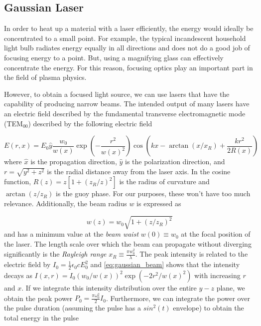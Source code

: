 \subsection{Gaussian Laser}
In order to heat up a material with a laser efficiently, the energy would ideally be concentrated to a small point. For example, the typical incandescent household light bulb radiates energy equally in all directions and does not do a good job of focusing energy to a point. But, using a magnifying glass can effectively concentrate the energy. For this reason, focusing optics play an important part in the field of plasma physics. 

However, to obtain a focused light source, we can use lasers that have the capability of producing narrow beams. The intended output of many lasers have an electric field described by the fundamental transverse electromagnetic mode \cite{Zangwill_2012} (TEM$_{00}$) described by the following electric field

\begin{equation}
	E(r, x) = E_0 \hat{y} \frac{w_0}{w(x)} \exp( - \frac{r^2}{w(x)^2}) \cos(k x - \arctan(x/x_R) + \frac{k r^2}{2 R(x)}) \label{eq:gaussian_beam}
\end{equation}
where $\hat{x}$ is the propagation direction, $\hat{y}$ is the polarization direction, and $r = \sqrt{y^2 + z^2}$ is the radial distance away from the laser axis. In the cosine function, $R(z) = z [1 + (z_R/z)^2]$ is the radius of curvature and $\arctan(z/z_R)$ is the guoy phase. For our purposes, these won't have too much relevance. Additionally, the beam radius $w$ is expressed as

\begin{equation}
	w(z) = w_0 \sqrt{1 + (z/z_R)^2} \label{eq:beam_radius}
\end{equation}  
and has a minimum value at the \emph{beam waist} $w(0) \equiv w_0$ at the focal position of the laser. The length scale over which the beam can propagate without diverging significantly is the \emph{Rayleigh range} $x_R \equiv \frac{\pi w_0^2}{\lambda}$. The peak intensity is related to the electric field by $I_0 = \frac{1}{2} \epsilon_0 c E_0^2$ and \cref{eq:gaussian_beam} shows that the intensity decays as $I(x, r) = I_0 (w_0 / w(x))^2 \exp(-2 r^2 / w(x)^2)$ with increasing $r$ and $x$. If we integrate this intensity distribution over the entire $y-z$ plane, we obtain the peak power $P_0 = \frac{\pi \omega_0^2}{2} I_0$. Furthermore, we can integrate the power over the pulse duration (assuming the pulse has a $sin^2(t)$ envelope) to obtain the total energy in the pulse 

